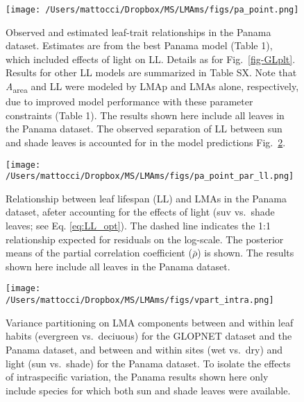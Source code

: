 \documentclass[
  12pt,
  a4paper,
,tablecaptionabove
]{scrartcl}
\begin{document}
\newpage

\begin{figure}

{\centering \texttt{[image: /Users/mattocci/Dropbox/MS/LMAms/figs/pa\_point.png]}

}

\caption{\label{fig-PAplt}Observed and estimated leaf-trait
relationships in the Panama dataset. Estimates are from the best Panama
model (Table 1), which included effects of light on LL. Details as for
Fig.~\ref{fig-GLplt}. Results for other LL models are summarized in
Table SX. Note that \emph{A}\textsubscript{area} and LL were modeled by
LMAp and LMAs alone, respectively, due to improved model performance
with these parameter constraints (Table 1). The results shown here
include all leaves in the Panama dataset. The observed separation of LL
between sun and shade leaves is accounted for in the model predictions
Fig.~\ref{fig-LLplt}.}

\end{figure}

\newpage

\begin{figure}

{\centering \texttt{[image: /Users/mattocci/Dropbox/MS/LMAms/figs/pa\_point\_par\_ll.png]}

}

\caption{\label{fig-LLplt}Relationship between leaf lifespan (LL) and
LMAs in the Panama dataset, afeter accounting for the effects of light
(suv vs.~shade leaves; see Eq. \ref{eq:LL_opt}). The dashed line
indicates the 1:1 relationship expected for residuals on the log-scale.
The posterior means of the partial correlation coefficient
(\(\bar{\rho}\)) is shown. The results shown here include all leaves in
the Panama dataset.}

\end{figure}

\newpage

\begin{figure}

{\centering \texttt{[image: /Users/mattocci/Dropbox/MS/LMAms/figs/vpart\_intra.png]}

}

\caption{\label{fig-vpart}Variance partitioning on LMA components
between and within leaf habits (evergreen vs.~deciuous) for the GLOPNET
dataset and the Panama dataset, and between and within sites (wet
vs.~dry) and light (sun vs.~shade) for the Panama dataset. To isolate
the effects of intraspecific variation, the Panama results shown here
only include species for which both sun and shade leaves were
available.}

\end{figure}
\end{document}
